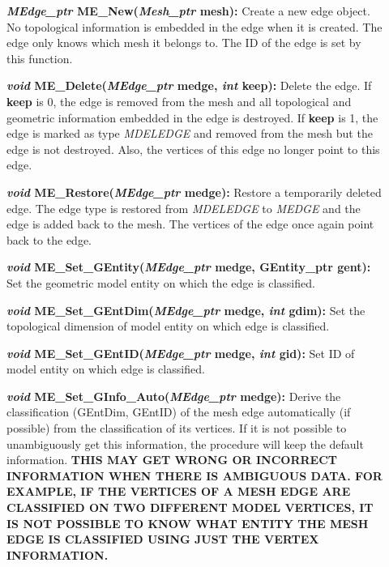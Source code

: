 \documentclass[12pt]{article}
\begin{document}
\begin{description}
\item[]{\bf {\em MEdge\_ptr} ME\_New({\em Mesh\_ptr} mesh):}
  Create a new edge object. No topological information is embedded in
  the edge when it is created. The edge only knows which mesh it
  belongs to. The ID of the edge is set by this function.
  
\item[]{\bf {\em void} ME\_Delete({\em MEdge\_ptr} medge,
    {\em int} keep):} Delete the edge. If {\bf keep} is 0, the
  edge is removed from the mesh and all topological and geometric
  information embedded in the edge is destroyed. If {\bf keep} is
  1, the edge is marked as type {\em MDELEDGE} and removed from the
  mesh but the edge is not destroyed. Also, the vertices of this edge
  no longer point to this edge.
    
\item[]{\bf {\em void} ME\_Restore({\em MEdge\_ptr}
    medge):} Restore a temporarily deleted edge. The edge type is
  restored from {\em MDELEDGE} to {\em MEDGE} and the edge is
  added back to the mesh. The vertices of the edge once again point
  back to the edge.

\item[]
  
\item[]{\bf {\em void} ME\_Set\_GEntity({\em MEdge\_ptr}
    medge, GEntity\_ptr gent):} Set the geometric model entity on
  which the edge is classified.
  
\item[]{\bf {\em void} ME\_Set\_GEntDim({\em MEdge\_ptr}
    medge, {\em int} gdim):} Set the topological dimension of model
  entity on which edge is classified.
  
\item[]{\bf {\em void} ME\_Set\_GEntID({\em MEdge\_ptr}
    medge, {\em int} gid):} Set ID of model entity on which edge is
  classified.
  
\item[]{\bf {\em void} ME\_Set\_GInfo\_Auto({\em MEdge\_ptr} medge):}
  Derive the classification (GEntDim, GEntID) of the mesh edge
  automatically (if possible) from the classification of its
  vertices. If it is not possible to unambiguously get this
  information, the procedure will keep the default information. {\bf THIS
  MAY GET WRONG OR INCORRECT INFORMATION WHEN THERE IS AMBIGUOUS
  DATA. FOR EXAMPLE, IF THE VERTICES OF A MESH EDGE ARE CLASSIFIED ON
  TWO DIFFERENT MODEL VERTICES, IT IS NOT POSSIBLE TO KNOW WHAT ENTITY
  THE MESH EDGE IS CLASSIFIED USING JUST THE VERTEX INFORMATION.}


\end{description}
\end{document}

